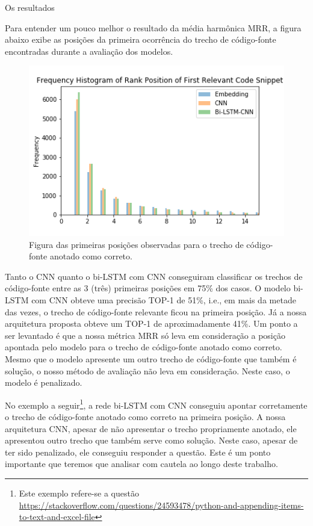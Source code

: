 Os resultados 

Para entender um pouco melhor o resultado da média harmônica MRR, a figura abaixo exibe as posições da primeira ocorrência do trecho de código-fonte encontradas durante a avaliação dos modelos.

\begin{figure}[h]
    \centering
    \includegraphics[width=1\textwidth]{figuras/cap-resultados-preliminares/histogram_results.png}
    \caption{Figura das primeiras posições observadas para o trecho de código-fonte anotado como correto.}
    \label{fig:histogram-mrr}
\end{figure}


Tanto o CNN quanto o bi-LSTM com CNN conseguiram classificar os trechos de código-fonte entre as 3 (três) primeiras posições em 75\% dos casos. O modelo bi-LSTM com CNN obteve uma precisão TOP-1 de 51\%, i.e., em mais da metade das vezes, o trecho de código-fonte relevante ficou na primeira posição. Já a nossa arquitetura proposta obteve um TOP-1 de aproximadamente 41\%. Um ponto a ser levantado é que a nossa métrica MRR só leva em consideração a posição apontada pelo modelo para o trecho de código-fonte anotado como correto. Mesmo que o modelo apresente um outro trecho de código-fonte que também é solução, o nosso método de avaliação não leva em consideração. Neste caso, o modelo é penalizado.

No exemplo a seguir\footnote{Este exemplo refere-se a questão \url{https://stackoverflow.com/questions/24593478/python-and-appending-items-to-text-and-excel-file}\label{foot:exemplo-resultados-preliminares}}, a rede bi-LSTM com CNN conseguiu apontar corretamente o trecho de código-fonte anotado como correto na primeira posição.
A nossa arquitetura CNN, apesar de não apresentar o trecho propriamente anotado, ele apresentou outro trecho que também serve como solução. Neste caso, apesar de ter sido penalizado, ele conseguiu responder a questão. Este é um ponto importante que teremos que analisar com cautela ao longo deste trabalho. 


